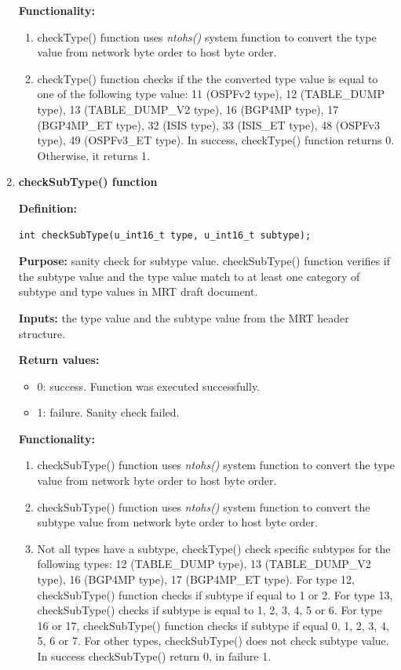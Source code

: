 \begin{enumerate}
\textbf{Functionality:}

\begin{enumerate}
\item{checkType() function uses \emph{ntohs()} system function to convert the type value from  network byte order to host byte order.}
\item{checkType() function checks if the the converted type value is equal to one of the following type value:  11 (OSPFv2 type), 12  (TABLE\_DUMP type), 13 (TABLE\_DUMP\_V2 type), 16 (BGP4MP type), 17   (BGP4MP\_ET type), 32   (ISIS type), 33   (ISIS\_ET type), 48   (OSPFv3 type), 49    (OSPFv3\_ET type). In success, checkType() function returns 0. Otherwise, it returns 1.}
\end{enumerate}

\item{\textbf{checkSubType() function}}


\textbf{Definition:}  
\begin{verbatim}
int checkSubType(u_int16_t type, u_int16_t subtype);
\end{verbatim}

\textbf{Purpose:}  sanity check for subtype value.  checkSubType() function verifies if the   subtype value and the type value match to at least one category of subtype and type values  in MRT draft document. 

\textbf{Inputs:} the type value and the subtype value from the MRT header structure.

\textbf{Return values:}
\begin{itemize}
\item{0: success. Function was executed successfully. }
\item{1: failure. Sanity check failed.}
\end{itemize} 

\textbf{Functionality:}

\begin{enumerate}
\item{checkSubType() function uses \emph{ntohs()} system function to convert the type value from  network byte order to host byte order.}
\item{checkSubType() function uses \emph{ntohs()} system function to convert the subtype value from  network byte order to host byte order.}
\item{Not all types have a subtype, checkType() check specific  subtypes for the following types:  12  (TABLE\_DUMP type), 13 (TABLE\_DUMP\_V2 type), 16 (BGP4MP type), 17   (BGP4MP\_ET type).   For type  12, checkSubType() function checks if subtype if equal to 1  or 2. For type 13, checkSubType() checks if subtype is equal to 1, 2, 3, 4, 5 or 6. For type  16 or 17, checkSubType() function checks if subtype if equal  0, 1, 2, 3, 4, 5, 6 or 7.  For other types, checkSubType() does not check subtype value. In success checkSubType() return 0, in failure 1. }


\end{enumerate}
\end{enumerate}
